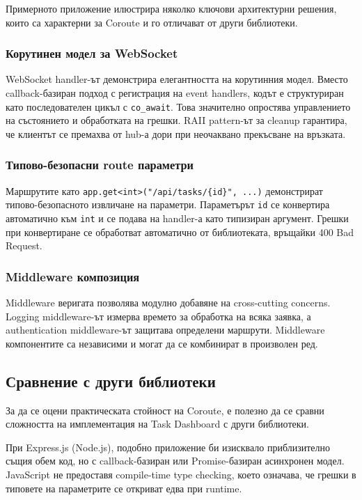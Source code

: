 Примерното приложение илюстрира няколко ключови архитектурни решения, които са характерни за Coroute и го отличават от други библиотеки.

\subsubsection{Корутинен модел за WebSocket}

WebSocket handler-ът демонстрира елегантността на корутинния модел. Вместо callback-базиран подход с регистрация на event handlers, кодът е структуриран като последователен цикъл с \texttt{co\_await}. Това значително опростява управлението на състоянието и обработката на грешки. RAII pattern-ът за cleanup гарантира, че клиентът се премахва от hub-а дори при неочаквано прекъсване на връзката.

\subsubsection{Типово-безопасни route параметри}

Маршрутите като \texttt{app.get<int>("/api/tasks/\{id\}", ...)} демонстрират типово-безопасното извличане на параметри. Параметърът \texttt{id} се конвертира автоматично към \texttt{int} и се подава на handler-а като типизиран аргумент. Грешки при конвертиране се обработват автоматично от библиотеката, връщайки 400 Bad Request.

\subsubsection{Middleware композиция}

Middleware веригата позволява модулно добавяне на cross-cutting concerns. Logging middleware-ът измерва времето за обработка на всяка заявка, а authentication middleware-ът защитава определени маршрути. Middleware компонентите са независими и могат да се комбинират в произволен ред.

\subsection{Сравнение с други библиотеки}

За да се оцени практическата стойност на Coroute, е полезно да се сравни сложността на имплементация на Task Dashboard с други библиотеки.

При Express.js (Node.js), подобно приложение би изисквало приблизително същия обем код, но с callback-базиран или Promise-базиран асинхронен модел. JavaScript не предоставя compile-time type checking, което означава, че грешки в типовете на параметрите се откриват едва при runtime.

